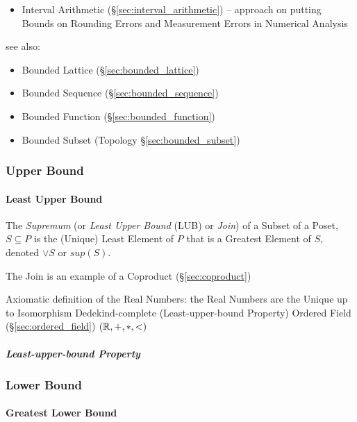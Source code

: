 \begin{itemize}
  \item Interval Arithmetic (\S\ref{sec:interval_arithmetic}) -- approach on
    putting Bounds on Rounding Errors and Measurement Errors in Numerical
    Analysis
\end{itemize}

see also:
\begin{itemize}
  \item Bounded Lattice (\S\ref{sec:bounded_lattice})
  \item Bounded Sequence (\S\ref{sec:bounded_sequence})
  \item Bounded Function (\S\ref{sec:bounded_function})
  \item Bounded Subset (Topology \S\ref{sec:bounded_subset})
\end{itemize}



\subsubsection{Upper Bound}\label{sec:upper_bound}



\paragraph{Least Upper Bound}\label{sec:least_upperbound}\hfill

The \emph{Supremum} (or \emph{Least Upper Bound} (LUB) or \emph{Join})
of a Subset of a Poset, $S \subseteq P$ is the (Unique) Least Element
of $P$ that is a Greatest Element of $S$, denoted $\vee S$ or $sup
(S)$.

The Join is an example of a Coproduct (\S\ref{sec:coproduct})

Axiomatic definition of the Real Numbers: the Real Numbers are the Unique up to
Isomorphism Dedekind-complete (Least-upper-bound Property) Ordered Field
(\S\ref{sec:ordered_field}) $(\mathbb{R}, +, *, <)$



\subparagraph{Least-upper-bound Property}
\label{sec:leastupperbound_property}\hfill



\subsubsection{Lower Bound}\label{sec:lower_bound}

\paragraph{Greatest Lower Bound}\label{sec:greatest_lowerbound}\hfill

